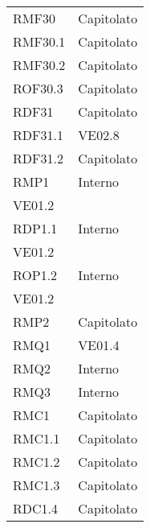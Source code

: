 \begin{longtable}[h!] { >{\centering}m{5cm} >{\centering}m{5cm} }
	\tabularnewline
	RMF30 & Capitolato
	\tabularnewline
	RMF30.1 & Capitolato
	\tabularnewline
	RMF30.2 & Capitolato
	\tabularnewline
	ROF30.3 & Capitolato
	\tabularnewline
	RDF31 & Capitolato
	\tabularnewline
	RDF31.1 & VE02.8
	\tabularnewline
	RDF31.2 & Capitolato
	\tabularnewline
	RMP1 & Interno\\VE01.2
	\tabularnewline
	RDP1.1 & Interno\\VE01.2
	\tabularnewline
	ROP1.2 & Interno\\VE01.2
	\tabularnewline
	RMP2 & Capitolato
	\tabularnewline
	RMQ1 & VE01.4
	\tabularnewline
	RMQ2 & Interno
	\tabularnewline
	RMQ3 & Interno
	\tabularnewline
	RMC1 & Capitolato
	\tabularnewline
	RMC1.1 & Capitolato
	\tabularnewline
	RMC1.2 & Capitolato
	\tabularnewline
	RMC1.3 & Capitolato
	\tabularnewline
	RDC1.4 & Capitolato
	\tabularnewline
	
\end{longtable}

